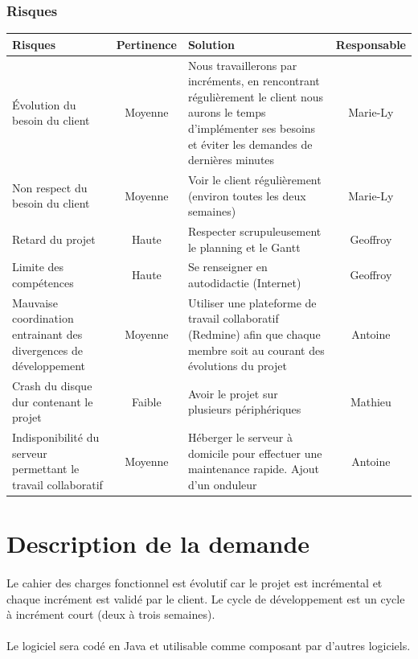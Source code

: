 \documentclass[12pt,a4paper,openany]{article}
\begin{document}
		\subsubsection{Risques}
		\begin{center}
		\begin{tabular}{|p{5.5cm}|c|p{6.5cm}|c|}
				\hline
				\textbf{Risques} & \textbf{Pertinence} & \textbf{Solution} & \textbf{Responsable} \\
				\hline
				Évolution du besoin du client & Moyenne &  Nous travaillerons par incréments, 
				en rencontrant régulièrement le client nous aurons le temps d'implémenter ses besoins et 
				éviter les demandes de dernières minutes & Marie-Ly \\ 
				\hline
				Non respect du besoin du client & Moyenne & Voir le client régulièrement (environ toutes les deux semaines) & Marie-Ly\\ 
				\hline
				Retard du projet & Haute & Respecter scrupuleusement le planning et le Gantt & Geoffroy\\
				\hline
				Limite des compétences & Haute & Se renseigner en autodidactie (Internet)& Geoffroy\\ 
				\hline
				Mauvaise coordination entrainant des divergences de développement& Moyenne & Utiliser une plateforme de travail collaboratif (Redmine) afin que
				chaque membre soit au courant des évolutions du projet & Antoine \\
				\hline
				Crash du disque dur contenant le projet & Faible& Avoir le projet sur plusieurs périphériques & Mathieu\\ \hline
				Indisponibilité du serveur permettant le travail collaboratif & Moyenne & Héberger le serveur à domicile pour effectuer une maintenance rapide.
				Ajout d'un onduleur & Antoine  \\
				\hline
			\end{tabular}
		\end{center}	
	\section{Description de la demande}
	\paragraph{}
		Le cahier des charges fonctionnel est évolutif car le projet est incrémental et chaque incrément 
		est validé par le client. Le cycle de développement est un cycle à incrément court (deux à trois semaines).
	\paragraph{}
		Le logiciel sera codé en Java et utilisable comme composant par d'autres logiciels.\\
\end{document}
